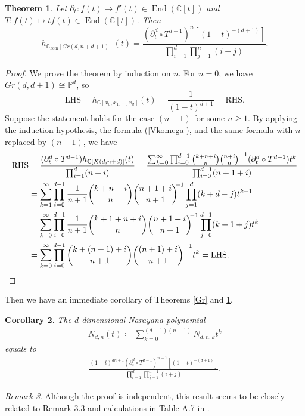 \documentclass[12pt]{extarticle}
\theoremstyle{plain}
\newtheorem{theo}{Theorem}[section]
\newtheorem{coro}[theo]{Corollary}
\theoremstyle{definition}
\theoremstyle{remark}
\newtheorem{rema}[theo]{Remark}
\DeclareMathOperator{\End}{End}
\newcommand{\C}{\mathbb{C}}
\begin{document}
\begin{theo}\label{diffGr} Let $\partial_t:f(t)\mapsto f'(t)\in\End(\C[t])$ and $T:f(t)\mapsto tf(t)\in\End(\C[t])$. Then
    $$h_{\C_{\hom}[Gr(d,n+d+1)]}(t)=\frac{(\partial_t^d\circ T^{d-1})^n\left[(1-t)^{-(d+1)}\right]}{\prod_{i=1}^d \prod_{j=1}^n(i+j)}.$$
\end{theo}
\begin{proof}
    We prove the theorem by induction on $n$. For $n=0$, we have $Gr(d,d+1)\cong\mathbb{P}^{d}$, so $$\mathrm{LHS}=h_{\C[x_0,x_1,\cdots,x_d]}(t)=\displaystyle\frac{1}{(1-t)^{d+1}}=\mathrm{RHS}.$$
    Suppose the statement holds for the case $(n-1)$ for some $n\geq1$. By applying the induction hypothesis, the formula (\ref{Vkomega}), and the same formula with $n$ replaced by $(n-1)$, we have
    \begin{align*}
        \mathrm{RHS}& =\frac{(\partial_t^d\circ T^{d-1})h_{\C[X(d,n+d)]}(t)}{\prod_{i=1}^d(n+i)}=\frac{\sum_{k=0}^{\infty}\prod_{i=0}^{d-1}\binom{k+n+i}{n}\binom{n+i}{n}^{-1}(\partial_t^d\circ T^{d-1})t^k}{\prod_{i=0}^{d-1}(n+1+i)}\\
        & =\sum_{k=1}^{\infty}\prod_{i=0}^{d-1}\frac{1}{n+1}\binom{k+n+i}{n}\binom{n+1+i}{n+1}^{\!\!-1}\prod_{j=1}^d(k+d-j) t^{k-1}\\
        & =\sum_{k=0}^{\infty}\prod_{i=0}^{d-1}\frac{1}{n+1}\binom{k+1+n+i}{n}\binom{n+1+i}{n+1}^{\!\!-1}\prod_{j=0}^{d-1}(k+1+j) t^{k}\\
        & =\sum_{k=0}^{\infty}\prod_{i=0}^{d-1}\binom{k+(n+1)+i}{n+1}\binom{(n+1)+i}{n+1}^{-1}t^{k}
        =\mathrm{LHS}.\qedhere
    \end{align*}
\end{proof}
Then we have an immediate corollary of Theorems \ref{Gr} and \ref{diffGr}.
\begin{coro}
    The $d$-dimensional Narayana polynomial
    \begin{align*}
        N_{d,n}(t)\coloneqq \sum_{k=0}^{(d-1)(n-1)}N_{d,n,k}t^k
    \end{align*}
  equals to
    \begin{align*}
        \frac{(1-t)^{dn+1}(\partial_t^d\circ T^{d-1})^{n-1}\left[(1-t)^{-(d+1)}\right]}{\prod_{i=1}^d \prod_{j=1}^{n-1}(i+j)}.
    \end{align*}
\end{coro}
\begin{rema}
Although the proof is independent, this result seems to be closely related to Remark 3.3 and calculations in Table A.7 in \cite{Agapito}. 
\end{rema}
\end{document}

